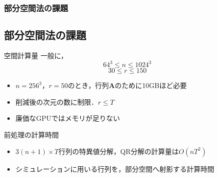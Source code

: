 \documentclass[aspectratio=169,dvipdfmx,hyperref={bookmarks=true}]{beamer}
\begin{document}


\begin{frame}
\frametitle{部分空間法の課題}
\subsection{部分空間法の課題}
	\begin{block}{空間計算量}
		一般に，
		\[64^3 \le n \le 1024^3\]
		\[30 \le r \le 150\]
   		\begin{itemize}
			\item $n = 256^3$，$r=50$のとき，行列$\bm{A}$のために10GBほど必要
   			\item 削減後の次元の数に制限．$r \le T$
   			\item 廉価なGPUではメモリが足りない
		\end{itemize}
	\end{block}

	\begin{block}{前処理の計算時間}
 		\begin{itemize}
		\item $3(n +1)\times T$行列の特異値分解，QR分解の計算量は$O(nT^2)$
		\item	シミュレーションに用いる行列を，部分空間へ射影する計算時間
	\end{itemize}
	\end{block}
\end{frame}

\end{document}
